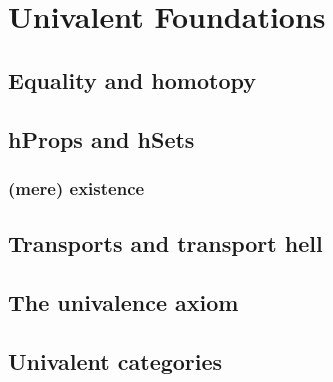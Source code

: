 \chapter{Univalent Foundations}

\section{Equality and homotopy}
\TODO
\section{hProps and hSets}
\TODO
\subsection{(mere) existence}
\section{Transports and transport hell}
\TODO
\section{The univalence axiom}
\TODO
\section{Univalent categories}
\TODO
